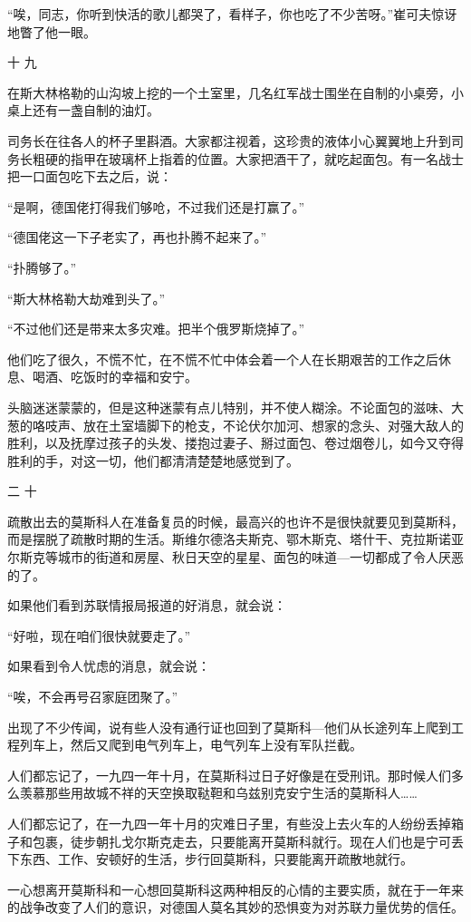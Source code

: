 “唉，同志，你听到快活的歌儿都哭了，看样子，你也吃了不少苦呀。”崔可夫惊讶地瞥了他一眼。

十 九

在斯大林格勒的山沟坡上挖的一个土室里，几名红军战士围坐在自制的小桌旁，小桌上还有一盏自制的油灯。

司务长在往各人的杯子里斟酒。大家都注视着，这珍贵的液体小心翼翼地上升到司务长粗硬的指甲在玻璃杯上指着的位置。大家把酒干了，就吃起面包。有一名战士把一口面包吃下去之后，说：

“是啊，德国佬打得我们够呛，不过我们还是打赢了。”

“德国佬这一下子老实了，再也扑腾不起来了。”

“扑腾够了。”

“斯大林格勒大劫难到头了。”

“不过他们还是带来太多灾难。把半个俄罗斯烧掉了。”

他们吃了很久，不慌不忙，在不慌不忙中体会着一个人在长期艰苦的工作之后休息、喝酒、吃饭时的幸福和安宁。

头脑迷迷蒙蒙的，但是这种迷蒙有点儿特别，并不使人糊涂。不论面包的滋味、大葱的咯吱声、放在土室墙脚下的枪支，不论伏尔加河、想家的念头、对强大敌人的胜利，以及抚摩过孩子的头发、搂抱过妻子、掰过面包、卷过烟卷儿，如今又夺得胜利的手，对这一切，他们都清清楚楚地感觉到了。

二 十

疏散出去的莫斯科人在准备复员的时候，最高兴的也许不是很快就要见到莫斯科，而是摆脱了疏散时期的生活。斯维尔德洛夫斯克、鄂木斯克、塔什干、克拉斯诺亚尔斯克等城市的街道和房屋、秋日天空的星星、面包的味道—一切都成了令人厌恶的了。

如果他们看到苏联情报局报道的好消息，就会说：

“好啦，现在咱们很快就要走了。”

如果看到令人忧虑的消息，就会说：

“唉，不会再号召家庭团聚了。”

出现了不少传闻，说有些人没有通行证也回到了莫斯科—他们从长途列车上爬到工程列车上，然后又爬到电气列车上，电气列车上没有军队拦截。

人们都忘记了，一九四一年十月，在莫斯科过日子好像是在受刑讯。那时候人们多么羡慕那些用故城不祥的天空换取鞑靼和乌兹别克安宁生活的莫斯科人……

人们都忘记了，在一九四一年十月的灾难日子里，有些没上去火车的人纷纷丢掉箱子和包裹，徒步朝扎戈尔斯克走去，只要能离开莫斯科就行。现在人们也是宁可丢下东西、工作、安顿好的生活，步行回莫斯科，只要能离开疏散地就行。

一心想离开莫斯科和一心想回莫斯科这两种相反的心情的主要实质，就在于一年来的战争改变了人们的意识，对德国人莫名其妙的恐惧变为对苏联力量优势的信任。


